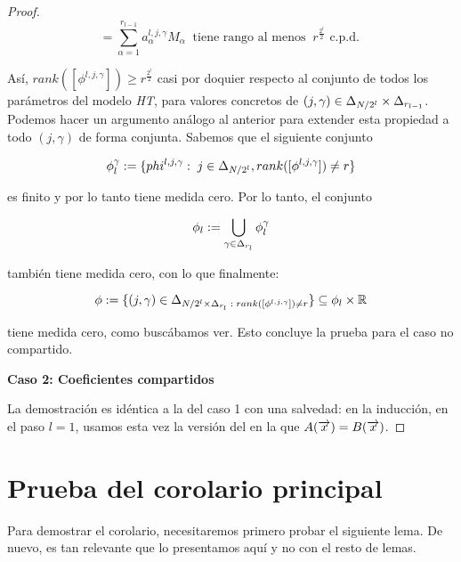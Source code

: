 \begin{proof}
    \begin{equation}
        [\phi^{l, j, \gamma}] = \sum_{\alpha = 1}^{r_{l-1}} a_\alpha^{l,j,\gamma} M_\alpha \;\; \text{tiene rango al menos} \; \; r^{\frac{2^l}{2}} \text{ c.p.d. }
    \end{equation}

    Así, $rank([\phi^{l, j, \gamma}]) \geq r^{\frac{2^l}{2}}$ casi por doquier respecto al conjunto de todos los parámetros del modelo \textit{HT}, para valores concretos de $(j, \gamma) \in \Delta_{N/2^l} \times \Delta_{r_{l-1}}$. Podemos hacer un argumento análogo al anterior para extender esta propiedad a todo $(j, \gamma)$ de forma conjunta. Sabemos que el siguiente conjunto

    \begin{equation}
        \phi_l^{\gamma} := \{ phi^{l, j, \gamma}: \; j \in \Delta_{N/2^l}, rank([\phi^{l, j, \gamma}]) \neq r \}
    \end{equation}

    es finito y por lo tanto tiene medida cero. Por lo tanto, el conjunto

    \begin{equation}
        \phi_l := \bigcup_{ \gamma \in \Delta_{r_l}} \phi_l^{\gamma}
    \end{equation}

    también tiene medida cero, con lo que finalmente:

    \begin{equation}
        \phi := \{ (j, \gamma) \in \Delta_{N/2^l \times \Delta_{r_l} \; : \; rank([\phi^{l, j, \gamma}]) \neq r} \} \subseteq \phi_l \times \mathbb{R}
    \end{equation}

    tiene medida cero, como buscábamos ver. Esto concluye la prueba para el caso no compartido.

    \textbf{Caso 2: Coeficientes compartidos}

    La demostración es idéntica a la del caso 1 con una salvedad: en la inducción, en el paso $l = 1$, usamos esta vez la versión del  en la que $A(\overrightarrow{x}) = B(\overrightarrow{x})$.
\end{proof}

\section{Prueba del corolario principal}

Para demostrar el corolario, necesitaremos primero probar el siguiente lema. De nuevo, es tan relevante que lo presentamos aquí y no con el resto de lemas.

